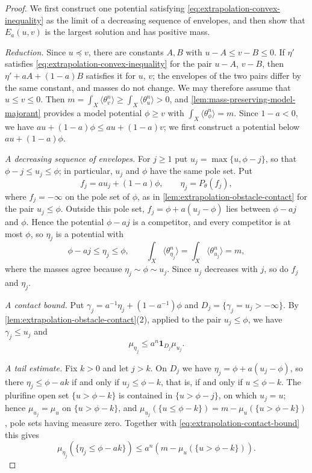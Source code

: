 \begin{proof}
We first construct one potential satisfying \eqref{eq:extrapolation-convex-inequality} as the limit of a decreasing sequence of envelopes, and then show that $E_a(u,v)$ is the largest solution and has positive mass.

\emph{Reduction.} Since $u\preceq v$, there are constants $A,B$ with $u-A\leq v-B\leq0$. If $\eta'$ satisfies \eqref{eq:extrapolation-convex-inequality} for the pair $u-A$, $v-B$, then $\eta'+aA+(1-a)B$ satisfies it for $u$, $v$; the envelopes of the two pairs differ by the same constant, and masses do not change. We may therefore assume that $u\leq v\leq0$. Then $m=\int_X\langle\theta_v^n\rangle\geq\int_X\langle\theta_u^n\rangle>0$, and \cref{lem:mass-preserving-model-majorant} provides a model potential $\phi\geq v$ with $\int_X\langle\theta_\phi^n\rangle=m$. Since $1-a<0$, we have $au+(1-a)\phi\leq au+(1-a)v$; we first construct a potential below $au+(1-a)\phi$.

\emph{A decreasing sequence of envelopes.} For $j\geq1$ put $u_j=\max\{u,\phi-j\}$, so that $\phi-j\leq u_j\leq\phi$; in particular, $u_j$ and $\phi$ have the same pole set. Put
\[
 f_j=au_j+(1-a)\phi,\qquad \eta_j=P_\theta(f_j),
\]
where $f_j=-\infty$ on the pole set of $\phi$, as in \cref{lem:extrapolation-obstacle-contact} for the pair $u_j\leq\phi$. Outside this pole set, $f_j=\phi+a(u_j-\phi)$ lies between $\phi-aj$ and $\phi$. Hence the potential $\phi-aj$ is a competitor, and every competitor is at most $\phi$, so $\eta_j$ is a potential with
\[
 \phi-aj\leq\eta_j\leq\phi,\qquad\int_X\langle\theta_{\eta_j}^n\rangle=\int_X\langle\theta_{u_j}^n\rangle=m,
\]
where the masses agree because $\eta_j\sim\phi\sim u_j$. Since $u_j$ decreases with $j$, so do $f_j$ and $\eta_j$.

\emph{A contact bound.} Put $\gamma_j=a^{-1}\eta_j+(1-a^{-1})\phi$ and $D_j=\{\gamma_j=u_j>-\infty\}$. By \cref{lem:extrapolation-obstacle-contact}(2), applied to the pair $u_j\leq\phi$, we have $\gamma_j\leq u_j$ and
\begin{equation}\label{eq:extrapolation-contact-bound}
 \mu_{\eta_j}\leq a^n\mathbf1_{D_j}\mu_{u_j}.
\end{equation}

\emph{A tail estimate.} Fix $k>0$ and let $j>k$. On $D_j$ we have $\eta_j=\phi+a(u_j-\phi)$, so there $\eta_j\leq\phi-ak$ if and only if $u_j\leq\phi-k$, that is, if and only if $u\leq\phi-k$. The plurifine open set $\{u>\phi-k\}$ is contained in $\{u>\phi-j\}$, on which $u_j=u$; hence $\mu_{u_j}=\mu_u$ on $\{u>\phi-k\}$, and $\mu_{u_j}(\{u\leq\phi-k\})=m-\mu_u(\{u>\phi-k\})$, pole sets having measure zero. Together with \eqref{eq:extrapolation-contact-bound} this gives
\begin{equation}\label{eq:extrapolation-tail-bound}
 \mu_{\eta_j}(\{\eta_j\leq\phi-ak\})
 \leq a^n\left(m-\mu_u(\{u>\phi-k\})\right).
\end{equation}


\end{proof}
